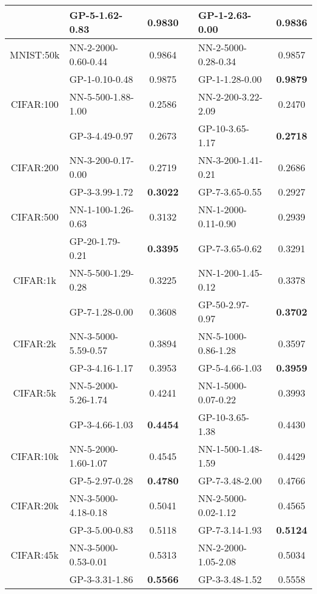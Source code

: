 \documentclass{article} %
\begin{document}
\begin{appendix}
\begin{table}[t!]
\begin{tabular}{c|lc|clc}
        & GP-5-1.62-0.83& 0.9830&& GP-1-2.63-0.00& \bf{ 0.9836 }\\ 
        \hline 
        MNIST:50k & NN-2-2000-0.60-0.44 &0.9864&& NN-2-5000-0.28-0.34 &0.9857\\ 
        & GP-1-0.10-0.48& 0.9875&& GP-1-1.28-0.00& \bf{ 0.9879 }\\ 
        \hline 
        \hline 
        CIFAR:100 & NN-5-500-1.88-1.00 &0.2586&& NN-2-200-3.22-2.09 &0.2470\\ 
        & GP-3-4.49-0.97& 0.2673&& GP-10-3.65-1.17& \bf{ 0.2718 }\\ 
        \hline 
        CIFAR:200 & NN-3-200-0.17-0.00 &0.2719&& NN-3-200-1.41-0.21 &0.2686\\ 
        & GP-3-3.99-1.72& \bf{ 0.3022 }&& GP-7-3.65-0.55& 0.2927\\ 
        \hline 
        CIFAR:500 & NN-1-100-1.26-0.63 &0.3132&& NN-1-2000-0.11-0.90 &0.2939\\ 
        & GP-20-1.79-0.21& \bf{ 0.3395 }&& GP-7-3.65-0.62& 0.3291\\ 
        \hline 
        CIFAR:1k & NN-5-500-1.29-0.28 &0.3225&& NN-1-200-1.45-0.12 &0.3378\\ 
        & GP-7-1.28-0.00& 0.3608&& GP-50-2.97-0.97& \bf{ 0.3702 }\\ 
        \hline 
        CIFAR:2k & NN-3-5000-5.59-0.57 &0.3894&& NN-5-1000-0.86-1.28 &0.3597\\ 
        & GP-3-4.16-1.17& 0.3953&& GP-5-4.66-1.03& \bf{ 0.3959 }\\ 
        \hline 
        CIFAR:5k & NN-5-2000-5.26-1.74 &0.4241&& NN-1-5000-0.07-0.22 &0.3993\\ 
        & GP-3-4.66-1.03& \bf{ 0.4454 }&& GP-10-3.65-1.38& 0.4430\\ 
        \hline 
        CIFAR:10k & NN-5-2000-1.60-1.07 &0.4545&& NN-1-500-1.48-1.59 &0.4429\\ 
        & GP-5-2.97-0.28& \bf{ 0.4780 }&& GP-7-3.48-2.00& 0.4766\\ 
        \hline 
        CIFAR:20k & NN-3-5000-4.18-0.18 &0.5041&& NN-2-5000-0.02-1.12 &0.4565\\ 
        & GP-3-5.00-0.83& 0.5118&& GP-7-3.14-1.93& \bf{ 0.5124 }\\ 
        \hline 
        CIFAR:45k & NN-3-5000-0.53-0.01 &0.5313&& NN-2-2000-1.05-2.08 &0.5034\\ 
        & GP-3-3.31-1.86& \bf{ 0.5566 }&& GP-3-3.48-1.52& 0.5558\\ 
        \hline
  \end{tabular}
\end{table}

\end{appendix}
\end{document}
